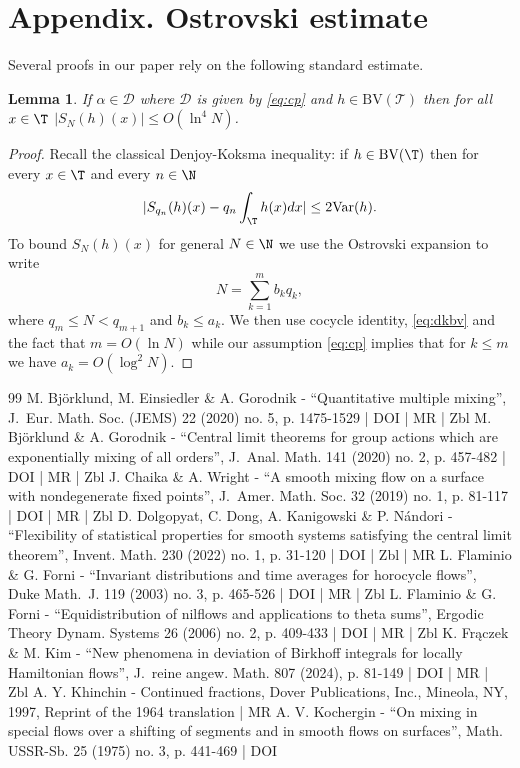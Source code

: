 \documentclass[10pt]{amsart}
\newcommand\BV{\mathrm{BV}}
\newcommand\cD{\mathcal{D}}
\newcommand\cT{\mathcal{T}}
\theoremstyle{definition}
\theoremstyle{plain}
\newtheorem{lemma}[definition]{Lemma}
\begin{document}
\appendix
\section*{Appendix. Ostrovski estimate}

Several proofs in our paper rely on the following standard estimate.

\begin{lemma}
\label{LmSumBV}
If $\alpha\in \cD$ where $\cD$ is given by \eqref{eq:cp} and $h\in \BV(\cT)$ then for all $x\in \T$
$|S_N(h)(x)|\leq O(\ln^4 N)$.
\end{lemma}

\begin{proof}
Recall
the classical Denjoy-Koksma inequality:
if $h\in \BV(\T)$ then
for every $x\in \T$ and every $n\in \N$
\begin{equation}\label{eq:dkbv}
|S_{q_n}(h)(x)-q_n\int_\T h(x) d x|\leq 2{\rm Var}(h).
\end{equation}
To bound $S_N(h)(x)$ for general $N\in\N$ we use the Ostrovski expansion to write
\[
N=\sum_{k=1}^m b_kq_k,
\]
where $q_m\leq N<q_{m+1}$
and $b_k\leq a_k$. We then use cocycle identity, \eqref{eq:dkbv} and the fact that $m=O(\ln N)$ while
our assumption \eqref{eq:cp} implies that for $k\leq m$ we have $a_k=O(\log^2 N)$.
\end{proof}



\begin{thebibliography}{99}
M. Björklund, M. Einsiedler \& A. Gorodnik - “Quantitative multiple mixing”, J. Eur. Math. Soc. (JEMS) 22 (2020) no. 5, p. 1475-1529 | DOI | MR | Zbl
M. Björklund \& A. Gorodnik - “Central limit theorems for group actions which are exponentially mixing of all orders”, J. Anal. Math. 141 (2020) no. 2, p. 457-482 | DOI | MR | Zbl
J. Chaika \& A. Wright - “A smooth mixing flow on a surface with nondegenerate fixed points”, J. Amer. Math. Soc. 32 (2019) no. 1, p. 81-117 | DOI | MR | Zbl
D. Dolgopyat, C. Dong, A. Kanigowski \& P. Nándori - “Flexibility of statistical properties for smooth systems satisfying the central limit theorem”, Invent. Math. 230 (2022) no. 1, p. 31-120 | DOI | Zbl | MR
L. Flaminio \& G. Forni - “Invariant distributions and time averages for horocycle flows”, Duke Math. J. 119 (2003) no. 3, p. 465-526 | DOI | MR | Zbl
L. Flaminio \& G. Forni - “Equidistribution of nilflows and applications to theta sums”, Ergodic Theory Dynam. Systems 26 (2006) no. 2, p. 409-433 | DOI | MR | Zbl
K. Frączek \& M. Kim - “New phenomena in deviation of Birkhoff integrals for locally Hamiltonian flows”, J. reine angew. Math. 807 (2024), p. 81-149 | DOI | MR | Zbl
A. Y. Khinchin - Continued fractions, Dover Publications, Inc., Mineola, NY, 1997, Reprint of the 1964 translation | MR
A. V. Kochergin - “On mixing in special flows over a shifting of segments and in smooth flows on surfaces”, Math. USSR-Sb. 25 (1975) no. 3, p. 441-469 | DOI
\end{thebibliography}
\end{document}
